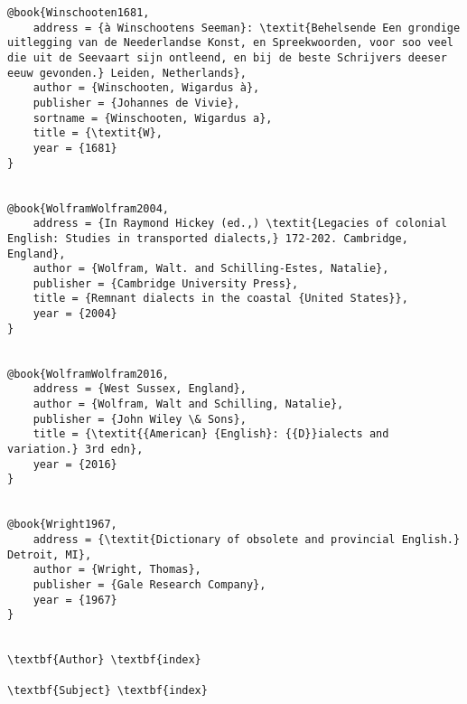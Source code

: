 \begin{verbatim}
@book{Winschooten1681,
	address = {à Winschootens Seeman}: \textit{Behelsende Een grondige uitlegging van de Neederlandse Konst, en Spreekwoorden, voor soo veel die uit de Seevaart sijn ontleend, en bij de beste Schrijvers deeser eeuw gevonden.} Leiden, Netherlands},
	author = {Winschooten, Wigardus à},
	publisher = {Johannes de Vivie},
	sortname = {Winschooten, Wigardus a},
	title = {\textit{W},
	year = {1681}
}


@book{WolframWolfram2004,
	address = {In Raymond Hickey (ed.,) \textit{Legacies of colonial English: Studies in transported dialects,} 172-202. Cambridge, England},
	author = {Wolfram, Walt. and Schilling-Estes, Natalie},
	publisher = {Cambridge University Press},
	title = {Remnant dialects in the coastal {United States}},
	year = {2004}
}


@book{WolframWolfram2016,
	address = {West Sussex, England},
	author = {Wolfram, Walt and Schilling, Natalie},
	publisher = {John Wiley \& Sons},
	title = {\textit{{American} {English}: {{D}}ialects and variation.} 3rd edn},
	year = {2016}
}


@book{Wright1967,
	address = {\textit{Dictionary of obsolete and provincial English.} Detroit, MI},
	author = {Wright, Thomas},
	publisher = {Gale Research Company},
	year = {1967}
}


\textbf{Author} \textbf{index}

\textbf{Subject} \textbf{index}

\end{verbatim}